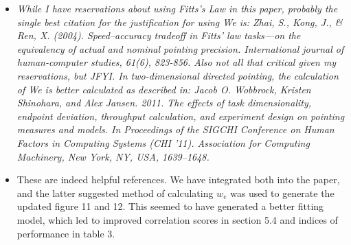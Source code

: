 \documentclass{article}
\begin{document}
\begin{itemize}

  \item \textit{While I have reservations about using Fitts's Law in this paper, probably the single best citation for the justification for using We is:
Zhai, S., Kong, J., \& Ren, X. (2004). Speed–accuracy tradeoff in Fitts' law tasks—on the equivalency of actual and nominal pointing precision. International journal of human-computer studies, 61(6), 823-856.
      Also not all that critical given my reservations, but JFYI. In two-dimensional directed pointing, the calculation of We is better calculated as described in:
    Jacob O. Wobbrock, Kristen Shinohara, and Alex Jansen. 2011. The effects of task dimensionality, endpoint deviation, throughput calculation, and experiment design on pointing measures and models. In Proceedings of the SIGCHI Conference on Human Factors in Computing Systems (CHI '11). Association for Computing Machinery, New York, NY, USA, 1639–1648.}
  \item[] These are indeed helpful references. We have integrated both into the paper, and the latter suggested method of calculating $w_e$ was used to generate the updated figure 11 and 12. This seemed to have generated a better fitting model, which led to improved correlation scores in section 5.4 and indices of performance in table 3.
    

\end{itemize}
\end{document}
